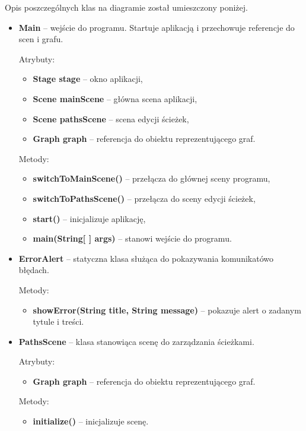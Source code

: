 \documentclass{article}
\begin{document}
Opis poszczególnych klas na diagramie został umieszczony poniżej.
\begin{itemize}
    \item \textbf{Main} -- wejście do programu. Startuje aplikacją i przechowuje referencje do scen i grafu.
    
    Atrybuty:
    \begin{itemize}
        \item \textbf{Stage stage} -- okno aplikacji,
        \item \textbf{Scene mainScene} -- główna scena aplikacji,
        \item \textbf{Scene pathsScene} -- scena edycji ścieżek,
        \item \textbf{Graph graph} -- referencja do obiektu reprezentującego graf.
    \end{itemize}
    
    Metody:
    \begin{itemize}
        \item \textbf{switchToMainScene()} -- przełącza do głównej sceny programu,
        \item \textbf{switchToPathsScene()} -- przełącza do sceny edycji ścieżek,
        \item \textbf{start()} -- inicjalizuje aplikację,
        \item \textbf{main(String[ ] args)} -- stanowi wejście do programu.
    \end{itemize}
    
    \item \textbf{ErrorAlert} -- statyczna klasa służąca do pokazywania komunikatów\linebreak o błędach.
    
    Metody:
    \begin{itemize}
        \item \textbf{showError(String title, String message)} -- pokazuje alert o zadanym tytule i treści.
    \end{itemize}
    
    \item \textbf{PathsScene} -- klasa stanowiąca scenę do zarządzania ścieżkami.
    
    Atrybuty:
    \begin{itemize}
        \item \textbf{Graph graph} -- referencja do obiektu reprezentującego graf.
    \end{itemize}
    
    Metody:
    \begin{itemize}
        \item \textbf{initialize()} -- inicjalizuje scenę.
    \end{itemize}
    

\end{itemize}
\end{document}
